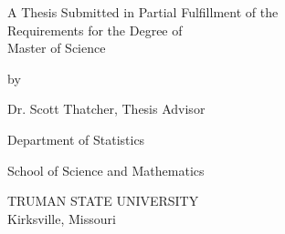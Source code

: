 \begin{titlepage}
\singlespacing
\centering%
\vspace*{1in}%
\makeatletter
{\MakeUppercase{\@title}}

\vspace{1in}
A Thesis Submitted in Partial Fulfillment of the \\
Requirements for the Degree of \\
Master of Science
\vspace{1in}

by
\vspace{0.3in}

\@author
\vspace{0.3in}

Dr. Scott Thatcher, Thesis Advisor 
\vspace{0.10in}

Department of Statistics 
\vspace{0.10in}

School of Science and Mathematics 
\vspace{0.10in}

\@date
\vfill

TRUMAN STATE UNIVERSITY \\

Kirksville, Missouri



\makeatother
\end{titlepage}


\newpage
\setcounter{page}{1}
\doublespacing
